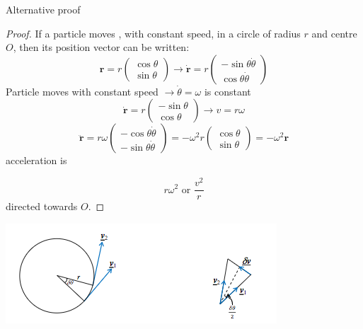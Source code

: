 \documentclass[a4paper]{article}
\begin{document}
Alternative proof
\begin{proof}
	If a particle moves , with constant speed, in a circle of radius $r$ and centre $O$, then its position vector can be written:
	\[
		\mathbf{r}=r\begin{pmatrix} \cos\theta \\ \sin\theta \end{pmatrix} \rightarrow \mathbf{\dot{r}}=r\begin{pmatrix}-\sin\theta \dot{\theta}\\ \cos\theta\dot{\theta}\end{pmatrix}
	\]
	Particle moves with constant speed $\rightarrow \dot{\theta}=\omega$ is constant
	\[
		\mathbf{\dot{r}}=r\begin{pmatrix}-\sin\theta \\ \cos\theta \end{pmatrix} \rightarrow v=r\omega
	\]
	\[
		\mathbf{\ddot{r}}=r\omega\begin{pmatrix}-\cos\theta \dot{\theta}\\ -\sin\theta\dot{\theta}\end{pmatrix}=-\omega^2r\begin{pmatrix} \cos\theta \\ \sin\theta \end{pmatrix}=-\omega^2\mathbf{r}
	\]
	acceleration is

	\[
		r\omega^2 \mbox{~or~} \frac{v^2}{r}
	\]
	directed towards $O$.
\end{proof}
\begin{center}
	\includegraphics[scale=0.5]{img_M/13_intro2}
\end{center}
\end{document}
